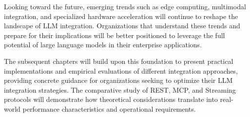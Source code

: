 Looking toward the future, emerging trends such as edge computing, multimodal integration, and specialized hardware acceleration will continue to reshape the landscape of LLM integration. Organizations that understand these trends and prepare for their implications will be better positioned to leverage the full potential of large language models in their enterprise applications.

The subsequent chapters will build upon this foundation to present practical implementations and empirical evaluations of different integration approaches, providing concrete guidance for organizations seeking to optimize their LLM integration strategies. The comparative study of REST, MCP, and Streaming protocols will demonstrate how theoretical considerations translate into real-world performance characteristics and operational requirements.


